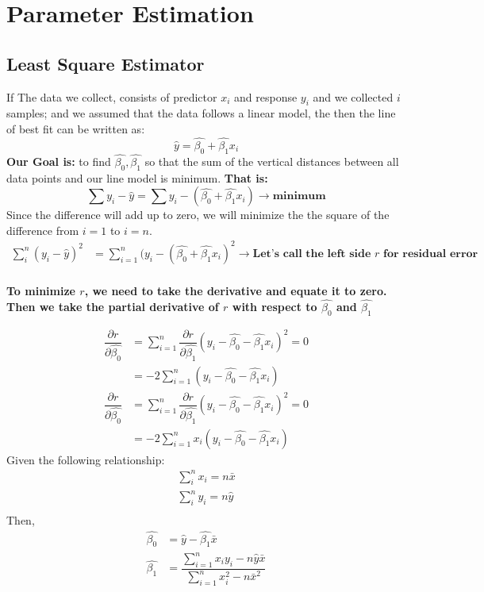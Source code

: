\documentclass[12pt,a4paper]{report}
\begin{document}
\section{Parameter Estimation}
\subsection{Least Square Estimator}
If The data we collect, consists of predictor $x_{i}$ and response $y_{i}$ and we collected $i$ samples; and we assumed that the data follows a linear model, the then the line of best fit can be written as:
$$\hat{y}=\hat{\beta_{0}}+\hat{\beta_{1}} x_{i}$$
\textbf{Our Goal is: } to find $\hat{\beta_{0}}, \hat{\beta_{1}}$ so that the sum of the vertical distances between all data points and our line model is minimum.
\textbf{That is: }
$$\sum y_{i}-\hat{y}= \sum y_{i}-(\hat{\beta_{0}}+\hat{\beta_{1}} x_{i})  \to \textbf{minimum}$$
Since the difference will add up to zero, we will minimize the the square of the difference from $i=1$ to $i=n$. 
\begin{align}
\sum_{i}^{n} (y_{i}-\hat{y})^{2} &= \sum_{i=1}^{n}(y_{i}-(\hat{\beta_{0}}+\hat{\beta_{1}}x_{i})^{2}  \to \textbf{Let's call the left side $r$ for residual error}\\
\end{align}

\textbf{To minimize $r$, we need to take the derivative and equate it to zero. Then we take the partial derivative of $r$ with respect to $\hat{\beta_{0}}$ and $\hat{\beta_{1}}$}

\begin{align*}
\dfrac{\partial r}{\partial \hat{\beta_{0}}} &= \sum_{i=1}^{n} \dfrac{\partial r}{\partial \hat{\beta_{1}}} (y_{i}-\hat{\beta_{0}}-\hat{\beta_{1}} x_{i})^{2} =0 \\
&= -2 \sum_{i=1}^{n}  (y_{i}-\hat{\beta_{0}}-\hat{\beta_{1}} x_{i})  \\
\dfrac{\partial r}{\partial \hat{\beta_{0}}} &= \sum_{i=1}^{n} \dfrac{\partial r}{\partial \hat{\beta_{1}}}  (y_{i}-\hat{\beta_{0}}-\hat{\beta_{1}} x_{i})^{2} =0 \\
&= -2\sum_{i=1}^{n} x_{i}(y_{i}-\hat{\beta_{0}}-\hat{\beta_{1}} x_{i}) 
\end{align*}
Given the following relationship:
\begin{align*}
\sum_{i}^{n} x_{i} = n \bar{x} \\
\sum_{i}^{n} y_{i} = n \hat{y}\\
\end{align*}
Then,
\begin{align*}
\hat{\beta_{0}} &= \hat{y}-\hat{\beta_{1}} \bar{x} \\
\hat{\beta_{1}} & = \dfrac{\displaystyle \sum_{i=1}^{n} x_{i} y_{i}  -  n \hat{y}\bar{x} }{\displaystyle \sum_{i=1}^{n}  x_{i}^{2} - n\bar{x}^{2}}\\
\end{align*}
\end{document}
